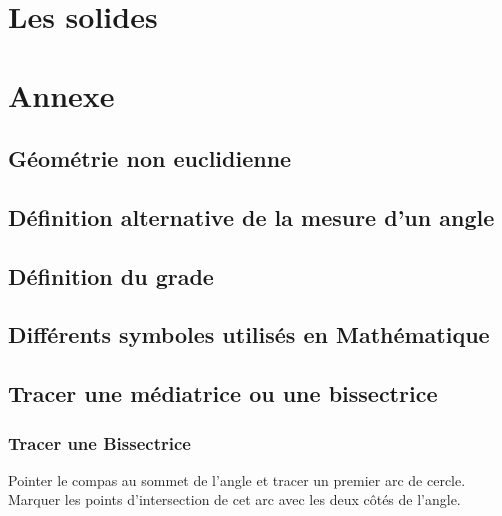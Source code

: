 \documentclass[a4paper, twoside]{article}
\begin{document}

\section{Les solides}


\section{Annexe}

\subsection*{Géométrie non euclidienne} \label{geo_non_euclidienne}

\subsection*{Définition alternative de la mesure d'un angle} \label{autre_def_angle}

\subsection*{Définition du grade} \label{grade}


\subsection*{Différents symboles utilisés en Mathématique} \label{symboles_math}


\subsection*{Tracer une médiatrice ou une bissectrice} \label{tracer_mediatrice_bissectrice}

\subsubsection*{Tracer une Bissectrice}
Pointer le compas au sommet de l'angle et tracer un premier arc de cercle. Marquer les points d'intersection de cet arc avec les deux côtés de l'angle.
\end{document}
